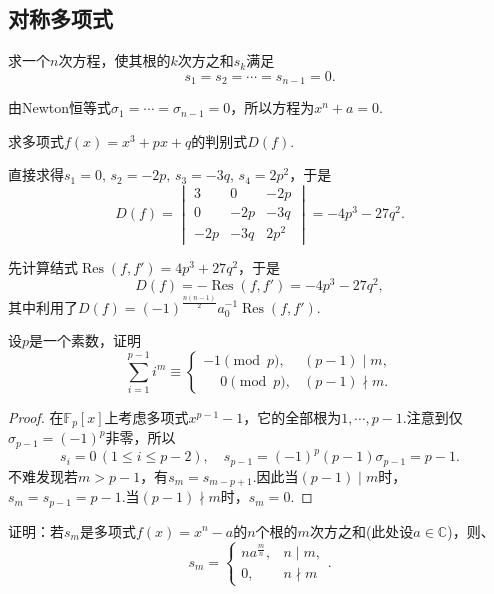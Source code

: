 \subsection{对称多项式}
\begin{prob}[7]
	求一个$n$次方程，使其根的$k$次方之和$s_k$满足
	\[
		s_1=s_2=\cdots=s_{n-1}=0.
	\]
\end{prob}
\begin{sol}
	由Newton恒等式$\sigma_1=\cdots=\sigma_{n-1}=0$，所以方程为$x^n+a=0$.
\end{sol}
\begin{prob}[8]
	求多项式$f(x)=x^3+px+q$的判别式$D(f)$.
\end{prob}
\begin{sol}[法一]
	直接求得$s_1=0,\,s_2=-2p,\,s_3=-3q,\,s_4=2p^2$，于是
	\[
		D(f)=\begin{vmatrix}
			3   & 0   & -2p  \\
			0   & -2p & -3q  \\
			-2p & -3q & 2p^2
		\end{vmatrix}=-4p^3-27q^2.
	\]
\end{sol}
\begin{sol}[法二]
	先计算结式$\operatorname*{Res}(f,f')=4p^3+27q^2$，于是
	\[
		D(f)=-\operatorname*{Res}(f,f')=-4p^3-27q^2,
	\]
	其中利用了$D(f)=(-1)^{\frac{n(n-1)}{2}}a_0^{-1}\operatorname*{Res}(f,f')$.
\end{sol}
\begin{prob}[9]
	设$p$是一个素数，证明
	\[
		\sum_{i=1}^{p-1}i^m\equiv\begin{cases}
			-1\pmod p,           & (p-1)\mid m,  \\
			\phantom{-}0\pmod p, & (p-1)\nmid m.
		\end{cases}
	\]
\end{prob}
\begin{proof}
	在$\mathbb{F}_p[x]$上考虑多项式$x^{p-1}-1$，它的全部根为$1,\cdots,p-1$.注意到仅$\sigma_{p-1}=(-1)^p$非零，所以
	\[
		s_i=0\,(1\le i\le p-2),\quad s_{p-1}=(-1)^p(p-1)\sigma_{p-1}=p-1.
	\]
	不难发现若$m>p-1$，有$s_m=s_{m-p+1}$.因此当$(p-1)\mid m$时，$s_m=s_{p-1}=p-1$.当$(p-1)\nmid m$时，$s_m=0$.
\end{proof}
\begin{prob}[10]
	证明：若$s_m$是多项式$f(x)=x^n-a$的$n$个根的$m$次方之和(此处设$a\in\mathbb{C}$)，则、
	\[
		s_m=\begin{cases}
			na^{\frac{m}{n}}, & n\mid m, \\
			0,                & n\nmid m
		\end{cases}.
	\]
\end{prob}
